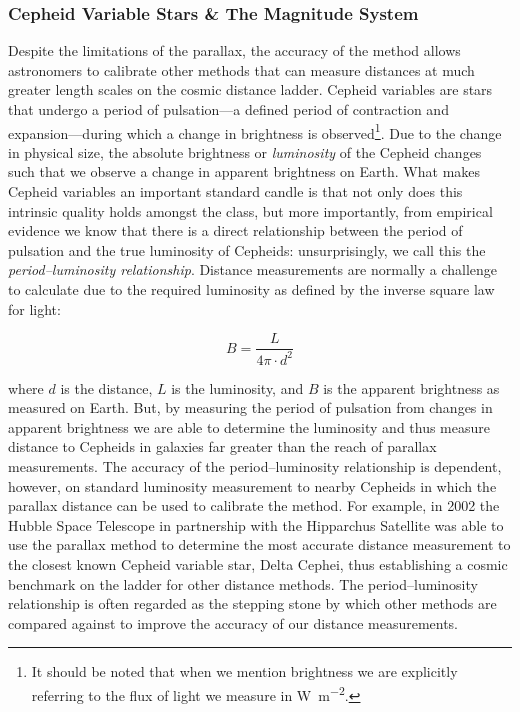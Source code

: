 \subsubsection{Cepheid Variable Stars \& The Magnitude
System}\label{cepheid-variable-stars-the-magnitude-system}

Despite the limitations of the parallax, the accuracy of the method
allows astronomers to calibrate other methods that can measure distances
at much greater length scales on the cosmic distance ladder. Cepheid
variables are stars that undergo a period of pulsation---a defined
period of contraction and expansion---during which a change in
brightness is
observed\footnote{It should be noted that when we mention brightness we are explicitly referring to the flux of light we measure in \si{\watt\per\metre\squared}.}.
Due to the change in physical size, the absolute brightness or
\emph{luminosity} of the Cepheid changes such that we observe a change
in apparent brightness on Earth. What makes Cepheid variables an
important standard candle is that not only does this intrinsic quality
holds amongst the class, but more importantly, from empirical evidence
we know that there is a direct relationship between the period of
pulsation and the true luminosity of Cepheids: unsurprisingly, we call
this the \emph{period--luminosity relationship}. Distance measurements
are normally a challenge to calculate due to the required luminosity as
defined by the inverse square law for light:

\begin{equation}B= \frac{L}{4 \pi \cdot d^2}\label{eq:invsqrlaw}\end{equation}

\noindent where \(d\) is the distance, \(L\) is the luminosity, and
\(B\) is the apparent brightness as measured on Earth. But, by measuring
the period of pulsation from changes in apparent brightness we are able
to determine the luminosity and thus measure distance to Cepheids in
galaxies far greater than the reach of parallax measurements. The
accuracy of the period--luminosity relationship is dependent, however,
on standard luminosity measurement to nearby Cepheids in which the
parallax distance can be used to calibrate the method. For example, in
2002 the Hubble Space Telescope in partnership with the Hipparchus
Satellite was able to use the parallax method to determine the most
accurate distance measurement to the closest known Cepheid variable
star, Delta Cephei, thus establishing a cosmic benchmark on the ladder
for other distance methods. The period--luminosity relationship is often
regarded as the stepping stone by which other methods are compared
against to improve the accuracy of our distance measurements.

